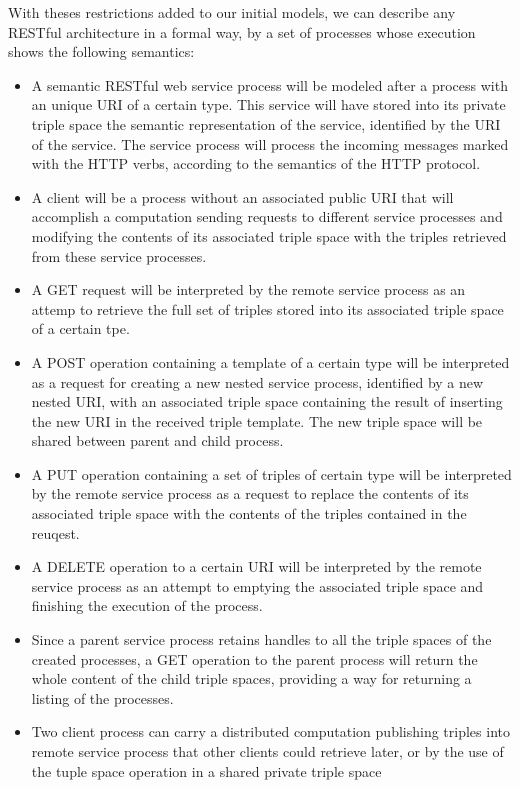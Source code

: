 With theses restrictions added to our initial models, we can describe any RESTful architecture in a formal way, by a set
of processes whose execution shows the following semantics:
\begin{itemize}
\item A semantic RESTful web service process will be modeled after a process with an unique URI of a certain type. This service will
  have stored into its private triple space the semantic representation of the service, identified by the URI of the
  service. The service process will process the incoming messages marked with the HTTP verbs, according to the semantics of the HTTP
  protocol.
\item A client will be a process without an associated public URI that will accomplish a computation sending requests to
  different service processes and modifying the contents of its associated triple space with the triples retrieved from
  these service processes.
\item A GET request will be interpreted by the remote service process as an attemp to retrieve the full set of triples
  stored into its associated triple space of a certain tpe.
\item A POST operation containing a template of a certain type will be interpreted as a request for creating a new
  nested service process, identified by a new nested URI, with an associated triple space containing the result of
  inserting the new URI in the received triple template. The new triple space will be shared between parent and child
  process.
\item A PUT operation containing a set of triples of certain type will be interpreted by the remote service process as a
  request to replace the contents of its associated triple space with the contents of the triples contained in the
  reuqest.
\item A DELETE operation to a certain URI will be interpreted by the remote service process as an attempt to emptying
  the associated triple space and finishing the execution of the process. 
\item Since a parent service process retains handles to all the triple spaces of the created processes, a GET operation
  to the parent process will return the whole content of the child triple spaces, providing a way for returning a
  listing of the processes.
\item Two client process can carry a distributed computation publishing triples into remote service process that other
  clients could retrieve later, or by the use of the tuple space operation in a shared private triple space
\end{itemize}

